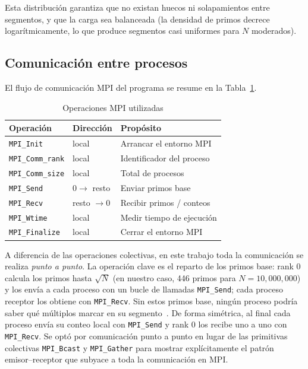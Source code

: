 \documentclass[conference]{IEEEtran}
\begin{document}
Esta distribución garantiza que no existan huecos ni solapamientos entre
segmentos, y que la carga sea balanceada (la densidad de primos decrece
logarítmicamente, lo que produce segmentos casi uniformes para $N$ moderados).

\subsection{Comunicación entre procesos}

El flujo de comunicación MPI del programa se resume en la
Tabla~\ref{tab:mpi_ops}.

\begin{table}[h]
\caption{Operaciones MPI utilizadas}
\label{tab:mpi_ops}
\centering
\footnotesize
\setlength{\tabcolsep}{4pt}
\begin{tabular}{@{}lll@{}}
\toprule
\textbf{Operación} & \textbf{Dirección} & \textbf{Propósito} \\
\midrule
\texttt{MPI\_Init} & local & Arrancar el entorno MPI \\
\texttt{MPI\_Comm\_rank} & local & Identificador del proceso \\
\texttt{MPI\_Comm\_size} & local & Total de procesos \\
\texttt{MPI\_Send} & $0 \to$ resto & Enviar primos base \\
\texttt{MPI\_Recv} & resto $\to 0$ & Recibir primos / conteos \\
\texttt{MPI\_Wtime} & local & Medir tiempo de ejecución \\
\texttt{MPI\_Finalize} & local & Cerrar el entorno MPI \\
\bottomrule
\end{tabular}
\end{table}

A diferencia de las operaciones colectivas, en este trabajo toda la
comunicación se realiza \emph{punto a punto}. La operación clave es el reparto
de los primos base: rank 0 calcula los primos hasta $\sqrt{N}$ (en nuestro
caso, 446 primos para $N = 10{,}000{,}000$) y los envía a cada proceso con un
bucle de llamadas \texttt{MPI\_Send}; cada proceso receptor los obtiene con
\texttt{MPI\_Recv}. Sin estos primos base, ningún proceso podría saber qué
múltiplos marcar en su segmento~\cite{gropp1999,quinn2003}. De forma simétrica,
al final cada proceso envía su conteo local con \texttt{MPI\_Send} y rank 0 los
recibe uno a uno con \texttt{MPI\_Recv}. Se optó por comunicación punto a punto
en lugar de las primitivas colectivas \texttt{MPI\_Bcast} y \texttt{MPI\_Gather}
para mostrar explícitamente el patrón emisor--receptor que subyace a toda la
comunicación en MPI.
\end{document}
